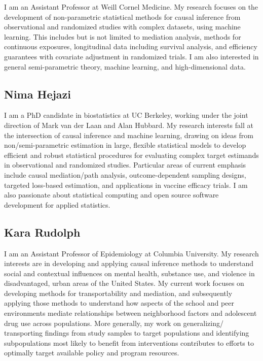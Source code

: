 \documentclass[
  12pt, krantz2,
]{book}
\theoremstyle{definition}
\theoremstyle{definition}
\theoremstyle{definition}
\newcommand{\1}{\mathbbm{1}}
\begin{document}
I am an Assistant Professor at Weill Cornel Medicine. My research
focuses on the development of non-parametric statistical methods for
causal inference from observational and randomized studies with
complex datasets, using machine learning. This includes but is not
limited to mediation analysis, methods for continuous exposures,
longitudinal data including survival analysis, and efficiency
guarantees with covariate adjustment in randomized trials. I am also
interested in general semi-parametric theory, machine learning, and
high-dimensional data.

\hypertarget{nima-hejazi}{%
\subsection*{Nima Hejazi}\label{nima-hejazi}}


I am a PhD candidate in biostatistics at UC Berkeley, working under the joint
direction of Mark van der Laan and Alan Hubbard. My research interests fall at
the intersection of causal inference and machine learning, drawing on ideas from
non/semi-parametric estimation in large, flexible statistical models to develop
efficient and robust statistical procedures for evaluating complex target
estimands in observational and randomized studies. Particular areas of current
emphasis include causal mediation/path analysis, outcome-dependent sampling
designs, targeted loss-based estimation, and applications in vaccine efficacy
trials. I am also passionate about statistical computing and open source
software development for applied statistics.

\hypertarget{kara-rudolph}{%
\subsection*{Kara Rudolph}\label{kara-rudolph}}


I am an Assistant Professor of Epidemiology at Columbia University. My research
interests are in developing and applying causal inference methods to understand
social and contextual influences on mental health, substance use, and violence
in disadvantaged, urban areas of the United States. My current work focuses on
developing methods for transportability and mediation, and subsequently applying
those methods to understand how aspects of the school and peer environments
mediate relationships between neighborhood factors and adolescent drug use
across populations. More generally, my work on generalizing/ transporting
findings from study samples to target populations and identifying subpopulations
most likely to benefit from interventions contributes to efforts to optimally
target available policy and program resources.
\end{document}
